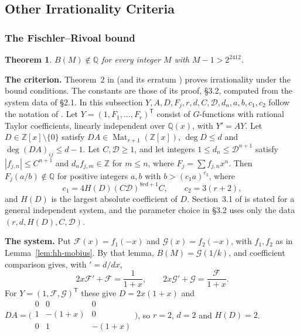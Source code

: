 \documentclass[oneside,english,11pt]{amsart}
\newtheorem{theorem}[thm]{Theorem}
\begin{document}

\subsection{Other Irrationality Criteria}\label{app:hh-other}

\subsubsection{The Fischler--Rivoal bound}

\begin{theorem}\label{thm:hh-fr}
$B(M)\notin\mathbb Q$ for every integer $M$ with $M-1>2^{2412}$.
\end{theorem}

\textbf{The criterion.} 
Theorem~2 in \cite{fischler2018rational} (and its erratum \cite{fischler2018erratum}) proves irrationality under the bound conditions. 
The constants are those of its proof, \S3.2, computed from the system data of \S2.1. In this subsection $Y,A,D,F_j,r,d,C,\mathcal D,d_n,a,b,c_1,c_2$
follow the notation of \cite{fischler2018rational}. Let $Y=(1,F_1,\ldots,F_r)^{\mathsf T}$ consist of
$G$-functions with rational Taylor coefficients, linearly independent over $\mathbb Q(x)$, with $Y'=AY$. Let
$D\in\mathbb Z[x]\setminus\{0\}$ satisfy $DA\in\operatorname{Mat}_{r+1}(\mathbb Z[x])$, $\deg D\le d$ and $\deg(DA)_{ij}\le d-1$. Let $C,\mathcal D\ge1$, and let
integers $1\le d_n\le\mathcal D^{n+1}$ satisfy $|f_{j,n}|\le C^{n+1}$ and $d_nf_{j,m}\in\mathbb Z$ for $m\le n$, where
$F_j=\sum f_{j,n}x^n$. Then $F_j(a/b)\notin\mathbb Q$ for positive integers $a,b$ with $b>(c_1a)^{c_2}$, where
\begin{equation}\label{eq:hh-frconstants}
 c_1=4H(D)(C\mathcal D)^{8rd+1}C,\qquad c_2=3(r+2),
\end{equation}
and $H(D)$ is the largest absolute coefficient of $D$. Section~3.1 of \cite{fischler2018rational} is stated for a general
independent system, and the parameter choice in \S3.2 uses only the data $(r,d,H(D),C,\mathcal D)$.

\textbf{The system.} Put $\mathcal F(x)=f_1(-x)$ and $\mathcal G(x)=f_2(-x)$, with $f_1,f_2$ as in Lemma~\ref{lem:hh-mobius}.
By that lemma, $B(M)=\mathcal G(1/k)$, and coefficient comparison gives, with $'=d/dx$,
\begin{equation}\label{eq:hh-firstorder}
 2x\mathcal F'+\mathcal F=\frac1{1+x},\qquad 2x\mathcal G'+\mathcal G=\frac{\mathcal F}{1+x}.
\end{equation}
For $Y=(1,\mathcal F,\mathcal G)^{\mathsf T}$ these give $D=2x(1+x)$ and
$DA=\bigl(\begin{smallmatrix}0&0&0\\1&-(1+x)&0\\0&1&-(1+x)\end{smallmatrix}\bigr)$, so $r=2$, $d=2$ and $H(D)=2$.
\end{document}
